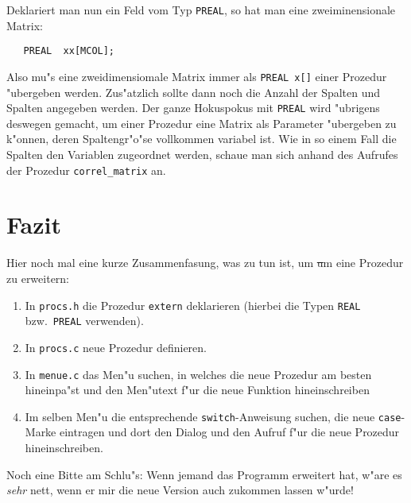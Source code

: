 Deklariert man nun ein Feld vom Typ {\tt PREAL}, so hat man eine
zweiminensionale Matrix:

\begin{verbatim}
   PREAL  xx[MCOL];
\end{verbatim}

Also mu"s eine zweidimensiomale Matrix immer als {\tt PREAL x[]} einer
Prozedur "ubergeben werden.  Zus"atzlich sollte dann noch die Anzahl
der Spalten und Spalten angegeben werden. Der ganze Hokuspokus mit
{\tt PREAL} wird "ubrigens deswegen gemacht, um einer Prozedur eine
Matrix als Parameter "ubergeben zu k"onnen, deren Spaltengr"o"se
vollkommen variabel ist.  Wie in so einem Fall die Spalten den
Variablen zugeordnet werden, schaue man sich anhand des Aufrufes der
Prozedur {\tt correl\_matrix} an.


\section{Fazit}
\label{sec:fazit}

Hier noch mal eine kurze Zusammenfasung, was zu tun ist, um \st um
eine Prozedur zu erweitern:

\begin{enumerate}
\item In {\tt procs.h} die Prozedur {\tt extern}
  deklarieren (hierbei die Typen {\tt REAL} bzw.\ {\tt PREAL} verwenden).
\item In {\tt procs.c} neue Prozedur definieren.
\item In {\tt menue.c} das Men"u suchen, in welches die neue Prozedur
  am besten hineinpa"st und den Men"utext f"ur die neue Funktion
  hineinschreiben
\item Im selben Men"u die entsprechende {\tt switch}-Anweisung
  suchen, die neue {\tt case}-Marke eintragen und dort den Dialog
  und den Aufruf f"ur die neue Prozedur hineinschreiben.
\end{enumerate}

\el
Noch eine Bitte am Schlu"s: Wenn jemand das Programm erweitert hat,
w"are es  {\em sehr\/} nett, wenn er mir die neue Version auch
zukommen lassen w"urde!


